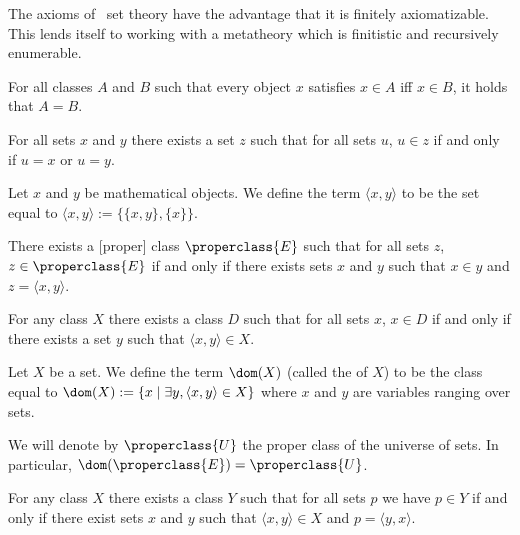 \begin{node}[Axioms]\label{nbg-0004}
The axioms of \NBG\ set theory have the advantage that it is finitely
axiomatizable. This lends itself to working with a metatheory which is
finitistic and recursively enumerable.

\begin{node}\label{nbg-0005}
For all classes $A$ and $B$ such that every object $x$ satisfies $x\in A$
iff $x\in B$, it holds that $A=B$.
\end{node}

\begin{node}\label{nbg-0006}
For all sets $x$ and $y$ there exists a set $z$ such that for all sets
$u$, $u\in z$ if and only if $u=x$ or $u=y$.
\end{node}

\begin{definition}\label{nbg-0007}
Let $x$ and $y$ be mathematical objects. We define the term $\langle x,y\rangle$
to be the set equal to $\langle x,y\rangle := \{\{x,y\}, \{x\}\}$.
\end{definition}

\begin{node}\label{nbg-0008}
There exists a [proper] class $\properclass{E}$ such that for all sets $z$,
$z\in\properclass{E}$ if and only if there exists sets $x$ and $y$ such
that $x\in y$ and $z=\langle x,y\rangle$.
\end{node}

\begin{node}\label{nbg-0009}
For any class $X$ there exists a class $D$ such that for all sets $x$,
$x\in D$ if and only if there exists a set $y$ such that $\langle x,y\rangle\in X$.
\end{node}

\begin{definition}\label{nbg-000A}
Let $X$ be a set. We define the term $\dom(X)$ (called the
 of $X$) to be the class equal to
$\dom(X):=\{x\mid\exists y,\langle x,y\rangle\in X\}$ where $x$ and $y$
are variables ranging over sets.
\end{definition}

\begin{node}\label{nbg-000B}
We will denote by $\properclass{U}$ the proper class of the universe of sets.
In particular, $\dom(\properclass{E})=\properclass{U}$.
\end{node}

\begin{node}\label{nbg-000C}
For any class $X$ there exists a class $Y$ such that for all sets $p$ we
have $p\in Y$ if and only if there exist sets $x$ and $y$ such that
$\langle x,y\rangle\in X$ and $p=\langle y,x\rangle$.
\end{node}
\end{node}

